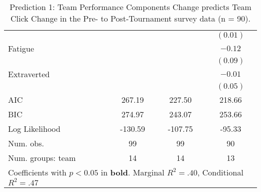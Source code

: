\begin{table}
\begin{center}
\begin{tabular}{l c c c }
                                                         &          &                       & $(0.01)$              \\
Fatigue                                                  &          &                       & $-0.12$               \\
                                                         &          &                       & $(0.09)$              \\
Extraverted                                              &          &                       & $-0.01$               \\
                                                         &          &                       & $(0.05)$              \\
\midrule
AIC                                                      & 267.19   & 227.50                & 218.66                \\
BIC                                                      & 274.97   & 243.07                & 253.66                \\
Log Likelihood                                           & -130.59  & -107.75               & -95.33                \\
Num. obs.                                                & 99       & 99                    & 90                    \\
Num. groups: team                                        & 14       & 14                    & 13                    \\

\bottomrule
\multicolumn{4}{l}{\scriptsize{Coefficients with $p < 0.05$ in \textbf{bold}. Marginal $R^2 = .40$, Conditional $R^2 = .47$}}
\end{tabular}
\caption{Prediction 1: Team Performance Components Change predicts Team Click Change in the Pre- to Post-Tournament survey data (n = 90).}
\label{tab:MLM21aJointActionSuccessClick}
\end{center}
\end{table}
